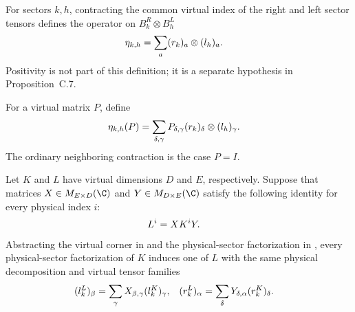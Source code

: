 \begin{definition}
    \label{def:mpdo_minimal_neighboring_operator}
    \leanok
    For sectors $k,h$, contracting the common virtual index of the right and
    left sector tensors defines the operator on $B_k^R\otimes B_h^L$
    \begin{align}
        \eta_{k,h}
         & =\sum_a(r_k)_a\otimes(l_h)_a.
        \notag
    \end{align}
    Positivity is not part of this definition; it is a separate hypothesis in
    Proposition~C.7.
\end{definition}

\begin{definition}
    \label{def:mpdo_matrix_weighted_neighboring_operator}
    \leanok
    For a virtual matrix $P$, define
    \begin{align}
        \eta_{k,h}(P)
         & =\sum_{\delta,\gamma}P_{\delta,\gamma}
        (r_k)_\delta\otimes(l_h)_\gamma.
        \notag
    \end{align}
    The ordinary neighboring contraction is the case $P=I$.
\end{definition}

\begin{definition}
    \label{def:mpdo_physical_sector_factorization_virtual_matrices}
    \leanok
    Let $K$ and $L$ have virtual dimensions $D$ and $E$, respectively.
    Suppose that matrices $X\in M_{E\times D}(\C)$ and
    $Y\in M_{D\times E}(\C)$ satisfy the following identity for every
    physical index $i$:
    \begin{align}
        L^i & =XK^iY.
        \notag
    \end{align}
    Abstracting the virtual corner in
    \cite[Section~2.3, lines~195--219]{Cirac2016MPDO_arXiv} and the
    physical-sector factorization in
    \cite[Appendix~C.2, lines~1381--1439]{Cirac2016MPDO_arXiv}, every
    physical-sector factorization of $K$ induces one of $L$ with the same
    physical decomposition and virtual tensor families
    \begin{align}
        (l_k^L)_\beta
         & =\sum_\gamma X_{\beta,\gamma}(l_k^K)_\gamma,
         &
        (r_k^L)_\alpha
         & =\sum_\delta Y_{\delta,\alpha}(r_k^K)_\delta.
        \notag
    \end{align}
\end{definition}


